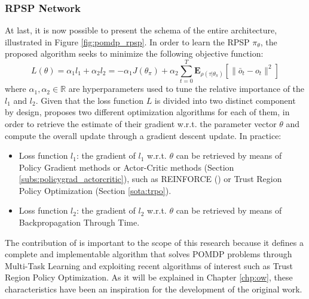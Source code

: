             \subsubsection{RPSP Network}
                At last, it is now possible to present the schema of the entire architecture, illustrated in Figure \ref{fig:pomdp_rpsp}. In order to learn the RPSP $\pi_\theta$, the proposed algorithm seeks to minimize the following objective function:
                \[ L(\theta) = \alpha_{1} l_1 + \alpha_{2} l_2 = - \alpha_1 J(\theta_\pi) + \alpha_2 \sum_{t=0}^{T} \mathbf{E}_{\rho(\tau|\theta_\pi)} \left[ \| \bar{o}_t - o_t \|^2 \right]\]
                where $\alpha_1, \alpha_2 \in \mathbb{R}$ are hyperparameters used to tune the relative importance of the $l_1$ and $l_2$. Given that the loss function $L$ is divided into two distinct component by design,  proposes two different optimization algorithms for each of them, in order to retrieve the estimate of their gradient w.r.t. the parameter vector $\theta$ and compute the overall update through a gradient descent update. In practice:
                \begin{itemize}
                    \item Loss function $l_1$: the gradient of $l_1$ w.r.t. $\theta$ can be retrieved by means of Policy Gradient methods or Actor-Critic methods (Section \ref{subs:policygrad_actorcritic}), such as REINFORCE () or Trust Region Policy Optimization (Section \ref{sota:trpo}).
                    \item Loss function $l_2$: the gradient of $l_2$ w.r.t. $\theta$ can be retrieved by means of Backpropagation Through Time.
                \end{itemize}
                
                The contribution of  is important to the scope of this research because it defines a complete and implementable algorithm that solves POMDP problems through Multi-Task Learning and exploiting recent algorithms of interest such as Trust Region Policy Optimization. As it will be explained in Chapter \ref{chp:ow}, these characteristics have been an inspiration for the development of the original work.
                

